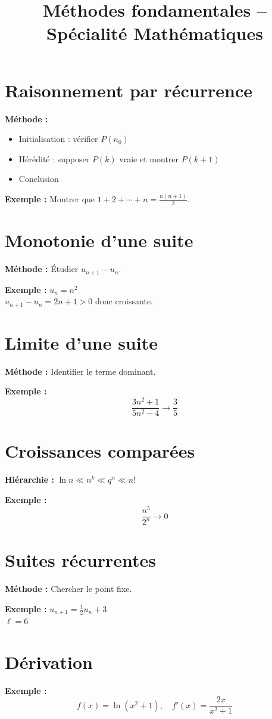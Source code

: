 \documentclass[11pt]{article}
\title{Méthodes fondamentales – Spécialité Mathématiques}
\date{}
\begin{document}
\maketitle

\section{Raisonnement par récurrence}
\textbf{Méthode :}
\begin{itemize}
\item Initialisation : vérifier $P(n_0)$
\item Hérédité : supposer $P(k)$ vraie et montrer $P(k+1)$
\item Conclusion
\end{itemize}

\textbf{Exemple :} Montrer que $1+2+\cdots+n=\frac{n(n+1)}{2}$.

\section{Monotonie d’une suite}
\textbf{Méthode :} Étudier $u_{n+1}-u_n$.

\textbf{Exemple :} $u_n = n^2$ \\
$u_{n+1}-u_n = 2n+1 > 0$ donc croissante.

\section{Limite d’une suite}
\textbf{Méthode :} Identifier le terme dominant.

\textbf{Exemple :}
\[
\frac{3n^2+1}{5n^2-4} \to \frac{3}{5}
\]

\section{Croissances comparées}
\textbf{Hiérarchie :} $\ln n \ll n^k \ll q^n \ll n!$

\textbf{Exemple :}
\[
\frac{n^5}{2^n} \to 0
\]

\section{Suites récurrentes}
\textbf{Méthode :} Chercher le point fixe.

\textbf{Exemple :} $u_{n+1} = \frac{1}{2}u_n +3$ \\
$\ell = 6$

\section{Dérivation}
\textbf{Exemple :}
\[
f(x)=\ln(x^2+1), \quad f'(x)=\frac{2x}{x^2+1}
\]
\end{document}
